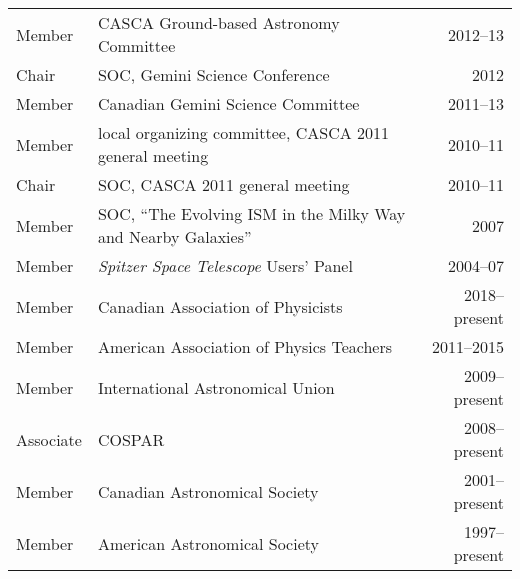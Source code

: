 \begin{tabularx}{\textwidth}{lXr}
Member& CASCA Ground-based Astronomy Committee& 2012--13\\
Chair& SOC, Gemini Science Conference& 2012\\
Member& Canadian Gemini Science Committee& 2011--13\\
Member& local organizing committee, CASCA 2011 general meeting&2010--11\\
Chair& SOC, CASCA 2011 general meeting&2010--11\\
Member& SOC, ``The Evolving ISM in the Milky Way and Nearby Galaxies'' & 2007\\
Member& {\it Spitzer Space Telescope} Users' Panel& 2004--07\\
Member& Canadian Association of Physicists& 2018--present\\
Member& American Association of Physics Teachers& 2011--2015\\
Member& International Astronomical Union& 2009--present\\
Associate& COSPAR& 2008--present\\
Member& Canadian Astronomical Society& 2001--present\\
Member& American Astronomical Society& 1997--present
\end{tabularx}
